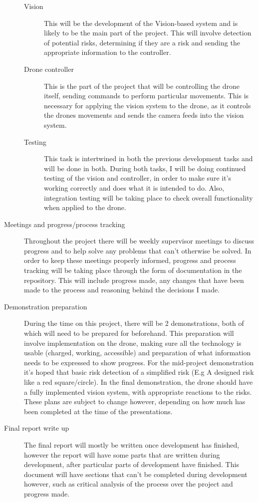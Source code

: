 \documentclass[11pt,fleqn,twoside]{article}
\begin{document}
\begin{description}
\begin{description}
      \item[Vision]
        This will be the development of the Vision-based system and is likely to be the main part of the project. This will involve detection of potential risks, determining if they are a risk and sending the appropriate information to the controller.
      \item[Drone controller]
        This is the part of the project that will be controlling the drone itself, sending commands to perform particular movements. This is necessary for applying the vision system to the drone, as it controls the drones movements and sends the camera feeds into the vision system.
      \item[Testing]
        This task is intertwined in both the previous development tasks and will be done in both. During both tasks, I will be doing continued testing of the vision and controller, in order to make sure it's working correctly and does what it is intended to do. Also, integration testing will be taking place to check overall functionality when applied to the drone. 
    \end{description}
  \item[Meetings and progress/process tracking]
    Throughout the project there will be weekly supervisor meetings to discuss progress and to help solve any problems that can't otherwise be solved. In order to keep these meetings properly informed, progress and process tracking will be taking place through the form of documentation in the repository. This will include progress made, any changes that have been made to the process and reasoning behind the decisions I made.
  \item[Demonstration preparation]
    During the time on this project, there will be 2 demonstrations, both of which will need to be prepared for beforehand. This preparation will involve implementation on the drone, making sure all the technology is usable (charged, working, accessible) and preparation of what information needs to be expressed to show progress. For the mid-project demonstration it's hoped that basic risk detection of a simplified risk (E.g A designed risk like a red square/circle). In the final demonstration, the drone should have a fully implemented vision system, with appropriate reactions to the risks. These plans are subject to change however, depending on how much has been completed at the time of the presentations.
  \item[Final report write up]
    The final report will mostly be written once development has finished, however the report will have some parts that are written during development, after particular parts of development have finished. This document will have sections that can't be completed during development however, such as critical analysis of the process over the project and progress made. 
\end{description}
\end{document}
